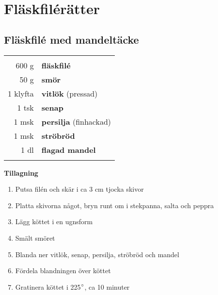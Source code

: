 
\section{Fläskfilérätter}

\clearpage

\subsection{Fläskfilé med mandeltäcke}

\begin{table}[H]
	\begin{tabular}{rl}
	\hline
	&\\
		600 g & \textbf{fläskfilé}\\
		50 g & \textbf{smör}\\
		1 klyfta & \textbf{vitlök} (pressad)\\
		1 tsk & \textbf{senap}\\
		1 msk & \textbf{persilja} (finhackad)\\
		1 msk & \textbf{ströbröd}\\
		1 dl & \textbf{flagad mandel}\\
	&\\
	\hline
	\end{tabular}
\end{table}


\begin{multicols*}{2}

\noindent \textbf{Tillagning}
\begin{enumerate}
	\itemsep0cm
	\item Putsa filén och skär i ca 3 cm tjocka skivor
	\item Platta skivorna något, bryn runt om i stekpanna, salta och peppra
	\item Lägg köttet i en ugnsform
	\item Smält smöret
	\item Blanda ner vitlök, senap, \mbox{persilja}, ströbröd och mandel
	\item Fördela blandningen över \mbox{köttet}
	\item Gratinera köttet i 225$\degree$, ca 10 minuter
\end{enumerate}

\end{multicols*}

